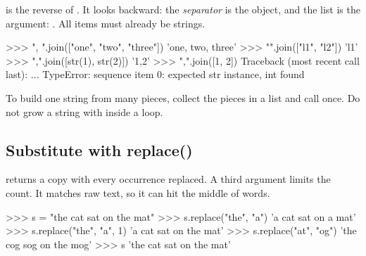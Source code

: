  is the reverse of . It looks backward: the \emph{separator} is the object, and the
list is the argument: . All items must already be strings.

\begin{center}
\end{center}

\begin{pycode}
>>> ", ".join(["one", "two", "three"])
'one, two, three'
>>> "\n".join(["l1", "l2"])
'l1'
>>> ",".join([str(1), str(2)])
'1,2'
>>> ",".join([1, 2])
Traceback (most recent call last):
  ...
TypeError: sequence item 0: expected str instance, int found
\end{pycode}

\begin{gamerule}
To build one string from many pieces, collect the pieces in a list and call
 once. Do not grow a string with \code{+} inside a loop.
\end{gamerule}

\subsection{Substitute with replace()}

 returns a copy with every occurrence replaced. A third argument limits the count.
It matches raw text, so it can hit the middle of words.

\begin{pycode}
>>> s = "the cat sat on the mat"
>>> s.replace("the", "a")
'a cat sat on a mat'
>>> s.replace("the", "a", 1)
'a cat sat on the mat'
>>> s.replace("at", "og")
'the cog sog on the mog'
>>> s
'the cat sat on the mat'
\end{pycode}

